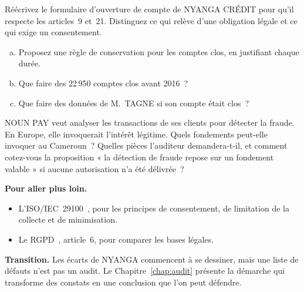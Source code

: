 \begin{boxexo}[title={\ding{45}\quad Exercice~2.2. Réécrire le formulaire \niveaumoyen}]
Réécrivez le formulaire d'ouverture de compte de NYANGA CRÉDIT pour qu'il
respecte les articles~9 et~21. Distinguez ce qui relève d'une obligation
légale et ce qui exige un consentement.
\end{boxexo}

\begin{boxexo}[title={\ding{45}\quad Exercice~2.3. Les comptes clos \niveaumoyen}]
\begin{enumerate}[(a)]
    \item Proposez une règle de conservation pour les comptes clos, en
          justifiant chaque durée.
    \item Que faire des 22\,950 comptes clos avant 2016~?
    \item Que faire des données de M.~TAGNE si son compte était clos~?
\end{enumerate}
\end{boxexo}

\begin{boxexo}[title={\ding{45}\quad Exercice~2.4. Sans intérêt légitime \niveauexpert}]
NOUN PAY veut analyser les transactions de ses clients pour détecter la
fraude. En Europe, elle invoquerait l'intérêt légitime. Quels fondements
peut-elle invoquer au Cameroun~? Quelles pièces l'auditeur demandera-t-il,
et comment cotez-vous la proposition « la détection de fraude repose sur un
fondement valable » si aucune autorisation n'a été délivrée~?
\end{boxexo}

\bigskip

\begin{boxinfo}
\textbf{Pour aller plus loin.}
\begin{itemize}
    \item L'ISO/IEC~29100~\cite{iso29100}, pour les principes de
          consentement, de limitation de la collecte et de minimisation.
    \item Le RGPD~\cite{ue2016rgpd}, article~6, pour comparer les bases
          légales.
\end{itemize}
\end{boxinfo}

\begin{boxinfo}
\textbf{Transition.} Les écarts de NYANGA commencent à se dessiner, mais
une liste de défauts n'est pas un audit. Le Chapitre~\ref{chap:audit}
présente la démarche qui transforme des constats en une conclusion que l'on peut défendre.
\end{boxinfo}
